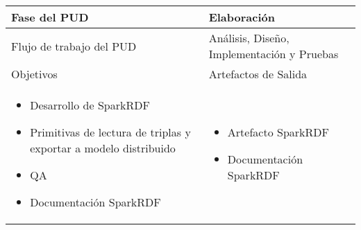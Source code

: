 \vspace{1cm}
\begin{tabular}{|p{}|p{}|}

\hline

\cellcolor[gray]{0.7}Fase del \acs{PUD} & Elaboración
 \\
\hline

\cellcolor[gray]{0.7}Flujo de trabajo del \acs{PUD} & Análisis, Diseño,
Implementación y Pruebas
 \\
\hline


\cellcolor[gray]{0.7}Objetivos  &
\cellcolor[gray]{0.7}Artefactos de Salida \\
\hline

\begin{itemize}
\item Desarrollo de SparkRDF
\item Primitivas de lectura de triplas y exportar a modelo distribuido
\item \acs{QA}
\item Documentación SparkRDF
\end{itemize}

&

\begin{itemize}
\item Artefacto SparkRDF
\item Documentación SparkRDF
\end{itemize}
\\
\hline
\end{tabular}


